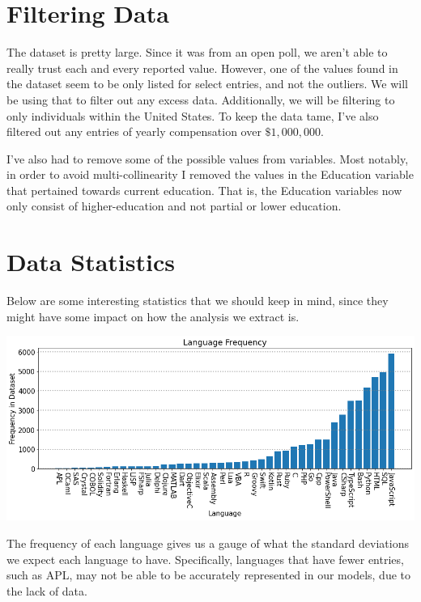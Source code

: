 \documentclass{report}
\begin{document}
\section{Filtering Data}

The dataset is pretty large. Since it was from an open poll, we aren't able to really trust each and every reported value. However, one of the values found in the dataset seem to be only listed for select entries, and not the outliers. We will be using that to filter out any excess data. Additionally, we will be filtering to only individuals within the United States. To keep the data tame, I've also filtered out any entries of yearly compensation over $\$1,000,000$.

I've also had to remove some of the possible values from variables. Most notably, in order to avoid multi-collinearity I removed the values in the Education variable that pertained towards current education. That is, the Education variables now only consist of higher-education and not partial or lower education.

\section{Data Statistics}

Below are some interesting statistics that we should keep in mind, since they might have some impact on how the analysis we extract is.

\vspace{0.5in}

\includegraphics[width=0.9\linewidth]{frequencyLanguage.png}

\vspace{0.5in}

The frequency of each language gives us a gauge of what the standard deviations we expect each language to have. Specifically, languages that have fewer entries, such as APL, may not be able to be accurately represented in our models, due to the lack of data.
\end{document}
